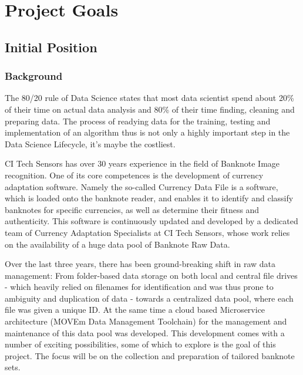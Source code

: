 \chapter{Project Goals}
\label{chap:projectgoals}

\section{Initial Position}
\subsection{Background}
The 80/20 rule of Data Science states that most data scientist spend about 20\% of their time on actual data analysis and 80\% of their time finding, cleaning and preparing data. The process of readying data for the training, testing and implementation of an algorithm thus is not only a highly important step in the Data Science Lifecycle, it's maybe the costliest.\par
CI Tech Sensors has over 30 years experience in the field of Banknote Image recognition. One of its core competences is the development of currency adaptation software. Namely the so-called Currency Data File is a software, which is loaded onto the banknote reader, and enables it to identify and classify banknotes for specific currencies, as well as determine their fitness and authenticity. This software is continuously updated and developed by a dedicated team of Currency Adaptation Specialists at CI Tech Sensors, whose work relies on the availability of a huge data pool of Banknote Raw Data. \par
Over the last three years, there has been ground-breaking shift in raw data management: From folder-based data storage on both local and central file drives -  which heavily relied on filenames for identification and was thus prone to ambiguity and duplication of data - towards a centralized data pool, where each file was given a unique ID. At the same time a cloud based Microservice architecture (MOVEm Data Management Toolchain) for the management and maintenance of this data pool was developed.
This development comes with a number of exciting possibilities, some of which to explore is the goal of this project. The focus will be on the collection and preparation of tailored banknote sets.\par

